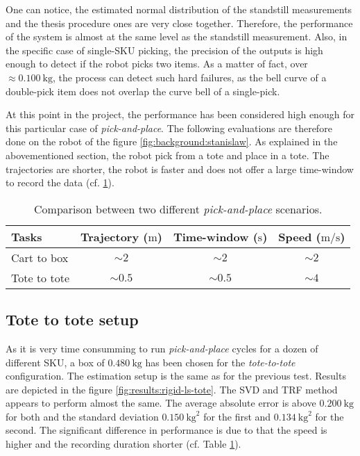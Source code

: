 \documentclass[/home/francois/latex/report/main.tex]{subfiles}
\begin{document}
One can notice, the estimated normal distribution of the standstill measurements and the thesis procedure ones are very close together. Therefore, the performance of the system is almost at the same level as the standstill measurement. Also, in the specific case of single-\ac{SKU} picking, the precision of the outputs is high enough to detect if the robot picks two items. As a matter of fact, over $\approx 0.100 \ \si{\kilogram}$, the process can detect such hard failures, as the bell curve of a double-pick item does not overlap the curve bell of a single-pick.

At this point in the project, the performance has been considered high enough for this particular case of \textit{pick-and-place}. The following evaluations are therefore done on the robot of the figure \ref{fig:background:stanislaw}. As explained in the abovementioned section, the robot pick from a tote and place in a tote. The trajectories are shorter, the robot is faster and does not offer a large time-window to record the data (cf. \ref{tab:results:comparison-robot}).

\begin{table}[h]
  \begin{center}
    \renewcommand{\arraystretch}{1.2} %
    \begin{tabular}{l|c|c|c} %
      \textbf{Tasks} & \textbf{Trajectory ($\si{\meter}$)} & \textbf{Time-window ($\si{\second}$)} & \textbf{Speed ($\si{\meter\per\second}$)} \\
      \hline
      Cart to box & $\sim 2$ & $\sim 2$ & $\sim 2$ \\
      \hline
      Tote to tote & $\sim 0.5$ & $\sim 0.5$ & $\sim 4$ \\
      \hline
    \end{tabular}
  \end{center}
  \caption{Comparison between two different \textit{pick-and-place} scenarios.\label{tab:results:comparison-robot}}
\end{table}

\subsection{Tote to tote setup}
\label{results:tote}

As it is very time consumming to run \textit{pick-and-place} cycles for a dozen of different \ac{SKU}, a box of $0.480 \ \si{\kilogram}$ has been chosen for the \textit{tote-to-tote} configuration. The estimation setup is the same as for the previous test. Results are depicted in the figure \ref{fig:results:rigid-ls-tote}. The \ac{SVD} and \ac{TRF} method appears to perform almost the same. The average absolute error is above $0.200 \ \si{\kilogram}$ for both and the standard deviation $0.150 \ \si{\kilogram\squared}$ for the first and $0.134 \ \si{\kilogram\squared}$ for the second. The significant difference in performance is due to that the speed is higher and the recording duration shorter (cf. Table \ref{tab:results:comparison-robot}).
\end{document}
